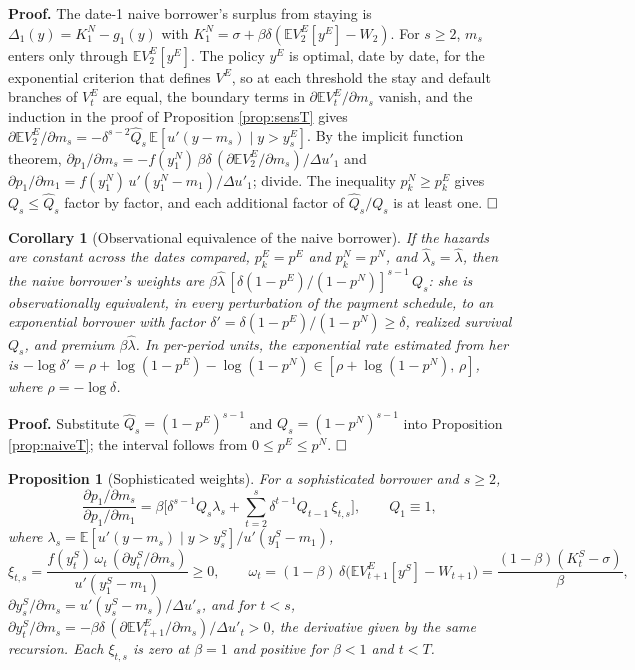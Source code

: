 \documentclass[12pt,english]{article}
\newtheorem{corollary}[theorem]{Corollary}
\newtheorem{proposition}[theorem]{Proposition}
\begin{document}
\noindent\textbf{Proof.} The date-1 naive borrower's surplus from staying is $\Delta_1(y) = K^N_1 - g_1(y)$ with $K^N_1 = \sigma + \beta\delta(\mathbb{E}V^E_2[y^E] - W_2)$. For $s \ge 2$, $m_s$ enters only through $\mathbb{E}V^E_2[y^E]$. The policy $y^E$ is optimal, date by date, for the exponential criterion that defines $V^E$, so at each threshold the stay and default branches of $V^E_t$ are equal, the boundary terms in $\partial\mathbb{E}V^E_t/\partial m_s$ vanish, and the induction in the proof of Proposition \ref{prop:sensT} gives $\partial\mathbb{E}V^E_2/\partial m_s = -\delta^{s-2}\hat Q_s\,\mathbb{E}[u'(y - m_s) \mid y > y^E_s]$. By the implicit function theorem, $\partial p_1/\partial m_s = -f(y^N_1)\,\beta\delta\,(\partial\mathbb{E}V^E_2/\partial m_s)/\Delta u'_1$ and $\partial p_1/\partial m_1 = f(y^N_1)\,u'(y^N_1 - m_1)/\Delta u'_1$; divide. The inequality $p^N_k \ge p^E_k$ gives $Q_s \le \hat Q_s$ factor by factor, and each additional factor of $\hat Q_s/Q_s$ is at least one. $\hfill\square$

\begin{corollary}[Observational equivalence of the naive borrower]\label{cor:naiveequiv}
If the hazards are constant across the dates compared, $p^E_k = p^E$ and $p^N_k = p^N$, and $\hat\lambda_s = \hat\lambda$, then the naive borrower's weights are $\beta\hat\lambda\,[\delta(1-p^E)/(1-p^N)]^{s-1}\,Q_s$: she is observationally equivalent, in every perturbation of the payment schedule, to an exponential borrower with factor $\delta' = \delta(1-p^E)/(1-p^N) \ge \delta$, realized survival $Q_s$, and premium $\beta\hat\lambda$. In per-period units, the exponential rate estimated from her is $-\log\delta' = \rho + \log(1-p^E) - \log(1-p^N) \in [\rho + \log(1-p^N),\, \rho]$, where $\rho = -\log\delta$.
\end{corollary}

\noindent\textbf{Proof.} Substitute $\hat Q_s = (1-p^E)^{s-1}$ and $Q_s = (1-p^N)^{s-1}$ into Proposition \ref{prop:naiveT}; the interval follows from $0 \le p^E \le p^N$. $\hfill\square$

\begin{proposition}[Sophisticated weights]\label{prop:sophT}
For a sophisticated borrower and $s \ge 2$,
\begin{equation}\label{eq:sophweight}
\frac{\partial p_1/\partial m_s}{\partial p_1/\partial m_1} = \beta\Big[\delta^{s-1}Q_s\lambda_s + \sum_{t=2}^{s}\delta^{t-1}Q_{t-1}\,\xi_{t,s}\Big], \qquad Q_1 \equiv 1,
\end{equation}
where $\lambda_s = \mathbb{E}[u'(y - m_s) \mid y > y^S_s]/u'(y^S_1 - m_1)$,
\[
\xi_{t,s} = \frac{f(y^S_t)\,\omega_t\,(\partial y^S_t/\partial m_s)}{u'(y^S_1 - m_1)} \ge 0, \qquad \omega_t = (1-\beta)\,\delta\big(\mathbb{E}V^E_{t+1}[y^S] - W_{t+1}\big) = \frac{(1-\beta)(K^S_t - \sigma)}{\beta},
\]
$\partial y^S_s/\partial m_s = u'(y^S_s - m_s)/\Delta u'_s$, and for $t < s$, $\partial y^S_t/\partial m_s = -\beta\delta\,(\partial\mathbb{E}V^E_{t+1}/\partial m_s)/\Delta u'_t > 0$, the derivative given by the same recursion. Each $\xi_{t,s}$ is zero at $\beta = 1$ and positive for $\beta < 1$ and $t < T$.
\end{proposition}
\end{document}

